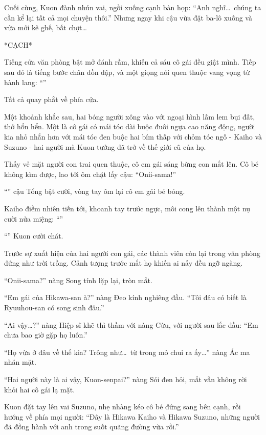 \documentclass[../main.tex]{subfiles}
\begin{document}
Cuối cùng, Kuon đành nhún vai, ngồi xuống cạnh bàn họp: ``Anh nghĩ\dots\ chúng ta cần kể lại tất cả mọi chuyện thôi.'' Nhưng ngay khi cậu vừa đặt ba-lô xuống và vừa mới kê ghế, bất chợt\dots

*CẠCH*

Tiếng cửa văn phòng bật mở đánh rầm, khiến cả sáu cô gái đều giật mình. Tiếp sau đó là tiếng bước chân dồn dập, và một giọng nói quen thuộc vang vọng từ hành lang: ``''

Tất cả quay phắt về phía cửa.

Một khoảnh khắc sau, hai bóng người xông vào với ngoại hình lấm lem bụi đất, thở hổn hển. Một là cô gái có mái tóc dài buộc đuôi ngựa cao năng động, người kia nhỏ nhắn hơn với mái tóc đen buộc hai bím thấp với chỏm tóc ngố - Kaiho và Suzuno - hai người mà Kuon tưởng đã trở về thế giới cũ của họ.

Thấy vẻ mặt người con trai quen thuộc, cô em gái sáng bừng con mắt lên. Cô bé không kìm được, lao tới ôm chặt lấy cậu: ``Onii-sama!''

``'' cậu Tổng bật cười, vòng tay ôm lại cô em gái bé bỏng.

Kaiho điềm nhiên tiến tới, khoanh tay trước ngực, môi cong lên thành một nụ cười nửa miệng: ``''

``'' Kuon cười chát.

Trước sự xuất hiện của hai người con gái, các thành viên còn lại trong văn phòng đứng như trời trồng. Cảnh tượng trước mắt họ khiến ai nấy đều ngỡ ngàng.

``Onii-sama?'' nàng Song tính lặp lại, tròn mắt.

``Em gái của Hikawa-san à?'' nàng Đeo kính nghiêng đầu. ``Tôi đâu có biết là Ryuuhou-san có song sinh đâu.''

``Ai vậy\dots?'' nàng Hiệp sĩ khẽ thì thầm với nàng Cừu, với người sau lắc đầu: ``Em chưa bao giờ gặp họ luôn.''

``Họ vừa ở đâu về thế kia? Trông như\dots\ từ trong mỏ chui ra ấy\dots'' nàng Ác ma nhăn mặt.

``Hai người này là ai vậy, Kuon-senpai?'' nàng Sói đen hỏi, mắt vẫn không rời khỏi hai cô gái lạ mặt.

Kuon đặt tay lên vai Suzuno, nhẹ nhàng kéo cô bé đứng sang bên cạnh, rồi hướng về phía mọi người: ``Đây là Hikawa Kaiho và Hikawa Suzuno, những người đã đồng hành với anh trong suốt quãng đường vừa rồi.''
\end{document}
